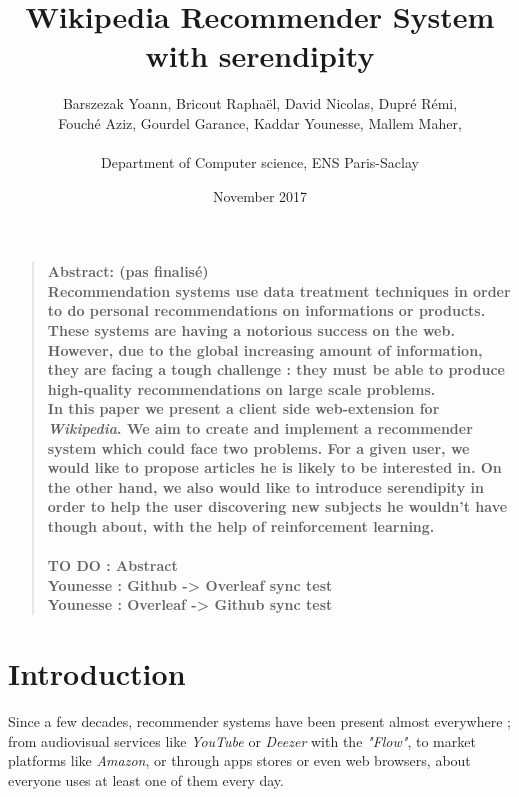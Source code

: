 \documentclass[11pt]{article}
\title{Wikipedia Recommender System with serendipity}
\author
    {
      Barszezak Yoann, Bricout Rapha\"el, David Nicolas, Dupr\'e R\'emi,\\
      Fouch\'e Aziz, Gourdel Garance, Kaddar Younesse, Mallem Maher,\\
      \\
      \normalsize{Department of Computer science, ENS Paris-Saclay}\\
    }
\date{November 2017}
\theoremstyle{plain}
\theoremstyle{definition}
\theoremstyle{remark}
\newenvironment{sciabstract}{
\begin{quote} \bf}
{\end{quote}}
\begin{document}
 


\baselineskip10pt


\maketitle 




\begin{sciabstract}
Abstract: (pas finalisé)\\

Recommendation systems use data treatment techniques in order to do personal recommendations on informations or products. These systems are having a notorious success on the web. However, due to the global increasing amount of information, they are facing a tough challenge : they must be able to produce high-quality recommendations on large scale problems. \\
In this paper we present a client side web-extension for \textit{Wikipedia}. We aim to create and implement a recommender system which could face two problems. For a given user, we would like to propose articles he is likely to be interested in. On the other hand, we also would like to introduce serendipity in order to help the user discovering new subjects he wouldn't have though about, with the help of reinforcement learning.\\ \\

  TO DO : Abstract\\
  Younesse : Github -> Overleaf sync test\\
  Younesse : Overleaf -> Github sync test
\end{sciabstract}


\tableofcontents


\section*{Introduction}

Since a few decades, recommender systems have been present almost everywhere ; from audiovisual services like \textit{YouTube} or \textit{Deezer} with the \textit{"Flow"}, to market platforms like \textit{Amazon}, or through apps stores or even web browsers, about everyone uses at least one of them every day. 
\end{document}
